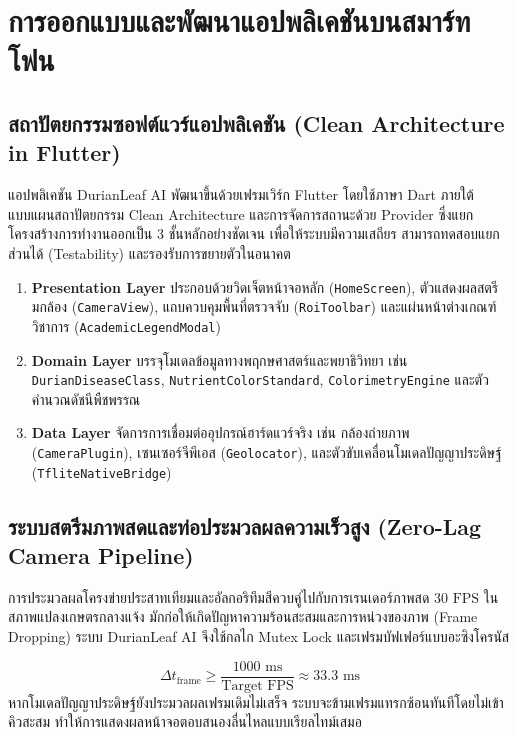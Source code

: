 \chapter{การออกแบบและพัฒนาแอปพลิเคชันบนสมาร์ทโฟน}

\section{สถาปัตยกรรมซอฟต์แวร์แอปพลิเคชัน (Clean Architecture in Flutter)}
แอปพลิเคชัน DurianLeaf AI พัฒนาขึ้นด้วยเฟรมเวิร์ก Flutter โดยใช้ภาษา Dart ภายใต้แบบแผนสถาปัตยกรรม Clean Architecture และการจัดการสถานะด้วย Provider ซึ่งแยกโครงสร้างการทำงานออกเป็น 3 ชั้นหลักอย่างชัดเจน เพื่อให้ระบบมีความเสถียร สามารถทดสอบแยกส่วนได้ (Testability) และรองรับการขยายตัวในอนาคต

\begin{enumerate}
  \item \textbf{Presentation Layer} ประกอบด้วยวิดเจ็ตหน้าจอหลัก (\texttt{HomeScreen}), ตัวแสดงผลสตรีมกล้อง (\texttt{CameraView}), แถบควบคุมพื้นที่ตรวจจับ (\texttt{RoiToolbar}) และแผ่นหน้าต่างเกณฑ์วิชาการ (\texttt{AcademicLegendModal})
  \item \textbf{Domain Layer} บรรจุโมเดลข้อมูลทางพฤกษศาสตร์และพยาธิวิทยา เช่น \texttt{DurianDiseaseClass}, \texttt{NutrientColorStandard}, \texttt{ColorimetryEngine} และตัวคำนวณดัชนีพืชพรรณ
  \item \textbf{Data Layer} จัดการการเชื่อมต่ออุปกรณ์ฮาร์ดแวร์จริง เช่น กล้องถ่ายภาพ (\texttt{CameraPlugin}), เซนเซอร์จีพีเอส (\texttt{Geolocator}), และตัวขับเคลื่อนโมเดลปัญญาประดิษฐ์ (\texttt{TfliteNativeBridge})
\end{enumerate}

\section{ระบบสตรีมภาพสดและท่อประมวลผลความเร็วสูง (Zero-Lag Camera Pipeline)}
การประมวลผลโครงข่ายประสาทเทียมและอัลกอริทึมสีควบคู่ไปกับการเรนเดอร์ภาพสด $30\text{ FPS}$ ในสภาพแปลงเกษตรกลางแจ้ง มักก่อให้เกิดปัญหาความร้อนสะสมและการหน่วงของภาพ (Frame Dropping) ระบบ DurianLeaf AI จึงใช้กลไก Mutex Lock และเฟรมบัฟเฟอร์แบบอะซิงโครนัส

\begin{equation}
  \Delta t_{\text{frame}} \ge \frac{1000\text{ ms}}{\text{Target FPS}} \approx 33.3\text{ ms}
\end{equation}
หากโมเดลปัญญาประดิษฐ์ยังประมวลผลเฟรมเดิมไม่เสร็จ ระบบจะข้ามเฟรมแทรกซ้อนทันทีโดยไม่เข้าคิวสะสม ทำให้การแสดงผลหน้าจอตอบสนองลื่นไหลแบบเรียลไทม์เสมอ

